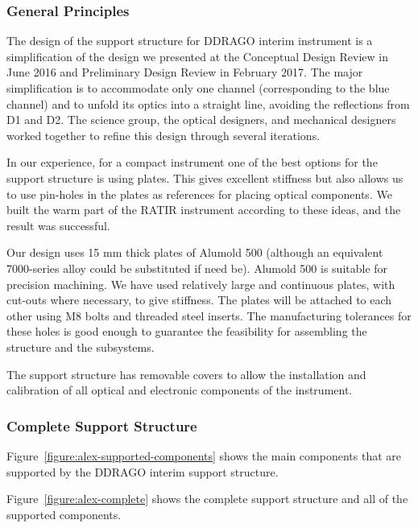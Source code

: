 \documentclass{article}
\newcommand{\TODO}[1]{\textcolor{red}{TODO: #1}}
\begin{document}
%

\subsubsection{General Principles}

The design of the support structure for DDRAGO interim instrument is a simplification of the design we presented at the Conceptual Design Review in June 2016 and Preliminary Design Review in February 2017. The major simplification is to accommodate only one channel (corresponding to the blue channel) and to unfold its optics into a straight line, avoiding the reflections from D1 and D2. The science group, the optical designers, and mechanical designers worked together to refine this design through several iterations.

In our experience, for a compact instrument one of the best options for the support structure is using plates. This gives excellent stiffness but also allows us to use pin-holes in the plates as references for placing optical components. We built the warm part of the RATIR instrument according to these ideas, and the result was successful.

Our design uses 15 mm thick plates of Alumold 500 (although an equivalent 7000-series alloy could be substituted if need be). Alumold 500 is suitable for precision machining. We have used relatively large and continuous plates, with cut-outs where necessary, to give stiffness. The plates will be attached to each other using M8 bolts and threaded steel inserts. The manufacturing tolerances for these holes is good enough to guarantee the feasibility for assembling the structure and the subsystems.

The support structure has removable covers to allow the installation and calibration of all optical and electronic components of the instrument.


\subsubsection{Complete Support Structure}

Figure~\ref{figure:alex-supported-components} shows the main components that are supported by the DDRAGO interim support structure.

Figure~\ref{figure:alex-complete} shows the complete support structure and all of the supported components.
\end{document}
